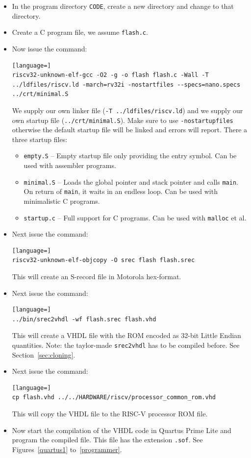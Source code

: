 \documentclass[12pt]{article}
\begin{document}
\begin{itemize}
\item In the program directory \lstinline|CODE|, create a new directory and change to that directory.
\item Create a C program file, we assume \lstinline|flash.c|.
\item Now issue the command:
\begin{lstlisting}[language=]
riscv32-unknown-elf-gcc -O2 -g -o flash flash.c -Wall -T ../ldfiles/riscv.ld -march=rv32i -nostartfiles --specs=nano.specs ../crt/minimal.S
\end{lstlisting}
We supply our own linker file (\lstinline|-T ../ldfiles/riscv.ld|) and we supply our own startup file (\lstinline|../crt/minimal.S|). Make sure to use \lstinline|-nostartupfiles| otherwise the default startup file will be linked and errors will report. There a three startup files:
\begin{itemize}
\item \texttt{empty.S} -- Empty startup file only providing the entry symbol. Can be used with assembler programs.
\item \texttt{minimal.S} -- Loads the global pointer and stack pointer and calls \texttt{main}. On return of \texttt{main}, it waits in an endless loop. Can be used with minimalistic C programs.
\item \texttt{startup.c} -- Full support for C programs. Can be used with \texttt{malloc} et al.
\end{itemize}
\item Next issue the command:
\begin{lstlisting}[language=]
riscv32-unknown-elf-objcopy -O srec flash flash.srec
\end{lstlisting}
This will create an S-record file in Motorola hex-format.
\item Next issue the command:
\begin{lstlisting}[language=]
../bin/srec2vhdl -wf flash.srec flash.vhd
\end{lstlisting}
This will create a VHDL file with the ROM encoded as 32-bit Little Endian quantities. Note: the taylor-made \texttt{srec2vhdl} has to be compiled before. See Section~\ref{sec:cloning}.
\item Next issue the command:
\begin{lstlisting}[language=]
cp flash.vhd ../../HARDWARE/riscv/processor_common_rom.vhd
\end{lstlisting}
This will copy the VHDL file to the RISC-V processor ROM file.
\item Now start the compilation of the VHDL code in Quartus Prime Lite and program the compiled file. This file has the extension \lstinline|.sof|. See Figures~\ref{quartus1} to~\ref{programmer}.


\end{itemize}
\end{document}
